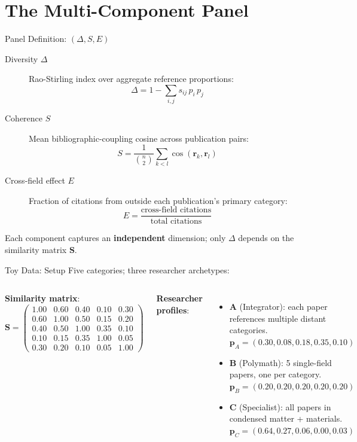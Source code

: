 \documentclass[aspectratio=169,10pt]{beamer}
\begin{document}
\section{The Multi-Component Panel}

\begin{frame}{Panel Definition: $(\Delta, S, E)$}
\begin{description}
  \item[Diversity $\Delta$] Rao-Stirling index over aggregate reference
        proportions:
  \[
    \Delta = 1 - \sum_{i,j} s_{ij}\, p_i\, p_j
  \]
  \item[Coherence $S$] Mean bibliographic-coupling cosine across
        publication pairs:
  \[
    S = \frac{1}{\binom{n}{2}} \sum_{k<l}
    \cos(\mathbf{r}_k, \mathbf{r}_l)
  \]
  \item[Cross-field effect $E$] Fraction of citations from outside
        each publication's primary category:
  \[
    E = \frac{\text{cross-field citations}}{\text{total citations}}
  \]
\end{description}
\medskip
Each component captures an \textbf{independent} dimension;
only $\Delta$ depends on the similarity matrix $\mathbf{S}$.
\end{frame}

\begin{frame}{Toy Data: Setup}
Five categories; three researcher archetypes:
\medskip
\small
\begin{columns}[T]
\textbf{Similarity matrix}:
\[
\mathbf{S} =
\begin{pmatrix}
1.00 & 0.60 & 0.40 & 0.10 & 0.30\\
0.60 & 1.00 & 0.50 & 0.15 & 0.20\\
0.40 & 0.50 & 1.00 & 0.35 & 0.10\\
0.10 & 0.15 & 0.35 & 1.00 & 0.05\\
0.30 & 0.20 & 0.10 & 0.05 & 1.00
\end{pmatrix}
\]

\textbf{Researcher profiles}:
\begin{itemize}\footnotesize
  \item \textbf{A} (Integrator): each paper references
        multiple distant categories.\\
        $\mathbf{p}_A = (0.30, 0.08, 0.18, 0.35, 0.10)$
  \item \textbf{B} (Polymath): 5 single-field papers, one per category.\\
        $\mathbf{p}_B = (0.20, 0.20, 0.20, 0.20, 0.20)$
  \item \textbf{C} (Specialist): all papers in condensed matter + materials.\\
        $\mathbf{p}_C = (0.64, 0.27, 0.06, 0.00, 0.03)$
\end{itemize}
\end{columns}
\end{frame}
\end{document}
